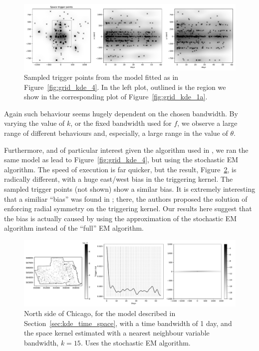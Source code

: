 \documentclass[twoside,a4paper]{article}
\theoremstyle{plain}
\theoremstyle{definition}
\begin{document}
\begin{figure}
  \includegraphics[width=\textwidth]{../notebooks/grid_kde_knn2.pdf}
  \caption{Sampled trigger points from the model fitted as in Figure~\ref{fig:grid_kde_4}.
  In the left plot, outlined is the region we show in the corresponding plot of
  Figure~\ref{fig:grid_kde_1a}.}
  \label{fig:grid_kde_4a}
\end{figure}

Again such behaviour seems hugely dependent on the chosen bandwidth.  By varying the
value of $k$, or the fixed bandwidth used for $f$, we observe a large range of different behaviours
and, especially, a large range in the value of $\theta$.

Furthermore, and of particular interest given the algorithm used in \cite{sepp}, we ran the same
model as lead to Figure~\ref{fig:grid_kde_4}, but using the stochastic EM algorithm.  The speed of
execution is far quicker, but the result, Figure~\ref{fig:grid_kde_5}, is radically different, with
a huge east/west bias in the triggering kernel.  The sampled trigger points (not shown) show a similar
bias.  It is extremely interesting that a similiar ``bias'' was found in \cite{rc}; there, the
authors proposed the solution of enforcing radial symmetry on the triggering kernel.  Our results
here suggest that the bias is actually caused by using the approximation of the stochastic EM
algorithm instead of the ``full'' EM algorithm.

\begin{figure}
  \includegraphics[width=\textwidth]{../notebooks/grid_kde_knn_sem_1.pdf}
  \caption{North side of Chicago, for the model described in Section~\ref{sec:kde_time_space},
  with a time bandwidth of 1 day, and the space kernel estimated with a nearest neighbour variable
  bandwidth, $k=15$.  Uses the stochastic EM algorithm.}
  \label{fig:grid_kde_5}
\end{figure}
\end{document}
